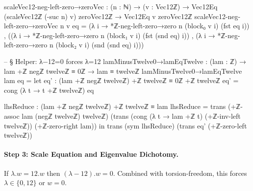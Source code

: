 \documentclass[11pt,a4paper]{book}
\def\cdot{.}%
\begin{document}
\begin{code}
scaleVec12-neg-left-zero→zeroVec : (n : ℕ) → (v : Vec12ℤ) →
  Vec12Eq (scaleVec12ℤ (-suc n) v) zeroVec12ℤ → Vec12Eq v zeroVec12ℤ
scaleVec12-neg-left-zero→zeroVec n v eq =
  (λ i → *ℤ-neg-left-zero→zero n (block₀ v i) (fst eq i)) ,
  ((λ i → *ℤ-neg-left-zero→zero n (block₁ v i) (fst (snd eq) i)) ,
   (λ i → *ℤ-neg-left-zero→zero n (block₂ v i) (snd (snd eq) i)))

-- § Helper: λ−12=0 forces λ=12
lamMinusTwelve0→lamEqTwelve : (lam : ℤ) → lam +ℤ negℤ twelveℤ ≡ 0ℤ → lam ≡ twelveℤ
lamMinusTwelve0→lamEqTwelve lam eq =
  let
    eq' : (lam +ℤ negℤ twelveℤ) +ℤ twelveℤ ≡ 0ℤ +ℤ twelveℤ
    eq' = cong (λ t → t +ℤ twelveℤ) eq

    lhsReduce : (lam +ℤ negℤ twelveℤ) +ℤ twelveℤ ≡ lam
    lhsReduce =
      trans
        (+ℤ-assoc lam (negℤ twelveℤ) twelveℤ)
        (trans
          (cong (λ t → lam +ℤ t) (+ℤ-inv-left twelveℤ))
          (+ℤ-zero-right lam))
  in
  trans (sym lhsReduce) (trans eq' (+ℤ-zero-left twelveℤ))
\end{code}

\paragraph{Step 3: Scale Equation and Eigenvalue Dichotomy.}
If $\lambda \cdot w = 12 \cdot w$ then $(\lambda - 12) \cdot w = 0$.
Combined with torsion-freedom, this forces $\lambda \in \{0, 12\}$
or $w = 0$.
\end{document}
